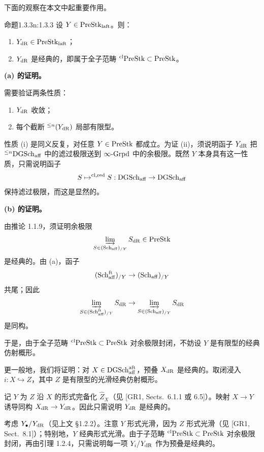 下面的观察在本文中起重要作用。

\begin{othm}{命题}{1.3.3}{n:1.3.3}
设 $Y\in\mathrm{PreStk}_{\mathrm{laft}}$。则：
\begin{enumerate}[label=(\alph*),leftmargin=2.2em,nosep]
\item $Y_{\mathrm{dR}}\in\mathrm{PreStk}_{\mathrm{laft}}$；
\item $Y_{\mathrm{dR}}$ 是经典的，即属于全子范畴 ${}^{\mathrm{cl}}\mathrm{PreStk}\subset\mathrm{PreStk}$。
\end{enumerate}
\end{othm}

\textbf{(a) 的证明。}

需要验证两条性质：
\begin{enumerate}[label=(\roman*),leftmargin=2.2em,nosep]
\item $Y_{\mathrm{dR}}$ 收敛；
\item 每个截断 ${}^{\le n}(Y_{\mathrm{dR}})$ 局部有限型。
\end{enumerate}
性质 (i) 是同义反复，对任意 $Y\in\mathrm{PreStk}$ 都成立。为证 (ii)，须说明函子 $Y_{\mathrm{dR}}$ 把 ${}^{\le n}\mathrm{DGSch}_{\mathrm{aff}}$ 中的滤过极限送到 $\infty\text{-}\mathrm{Grpd}$ 中的余极限。既然 $Y$ 本身具有这一性质，只需说明函子
\[
S\mapsto^{\mathrm{cl,red}} S:\mathrm{DGSch}_{\mathrm{aff}}\to\mathrm{DGSch}_{\mathrm{aff}}
\]
保持滤过极限，而这是显然的。

\textbf{(b) 的证明。}

由推论 1.1.9，须证明余极限
\[
\varinjlim_{S\in(\mathrm{Sch}_{\mathrm{aff}})_{/Y}}S_{\mathrm{dR}}\in\mathrm{PreStk}
\]
是经典的。由 (a)，函子
\[
(\mathrm{Sch}_{\mathrm{aff}}^{\mathrm{ft}})_{/Y}\to(\mathrm{Sch}_{\mathrm{aff}})_{/Y}
\]
共尾；因此
\[
\varinjlim_{S\in(\mathrm{Sch}_{\mathrm{aff}}^{\mathrm{ft}})_{/Y}}S_{\mathrm{dR}}\to\varinjlim_{S\in(\mathrm{Sch}_{\mathrm{aff}})_{/Y}}S_{\mathrm{dR}}
\]
是同构。

于是，由于全子范畴 ${}^{\mathrm{cl}}\mathrm{PreStk}\subset\mathrm{PreStk}$ 对余极限封闭，不妨设 $Y$ 是有限型的经典仿射概形。

更一般地，我们将证明：对 $X\in\mathrm{DGSch}_{\mathrm{aff}}^{\mathrm{aft}}$，预叠 $X_{\mathrm{dR}}$ 是经典的。取闭浸入 $i:X\hookrightarrow Z$，其中 $Z$ 是有限型的光滑经典仿射概形。

记 $Y$ 为 $Z$ 沿 $X$ 的形式完备化 $\widehat{Z}_X$（见 [GR1, Sects.~6.1.1 或 6.5]）。映射 $X\to Y$ 诱导同构 $X_{\mathrm{dR}}\to Y_{\mathrm{dR}}$。因此只需说明 $Y_{\mathrm{dR}}$ 是经典的。

考虑 $Y_\bullet/Y_{\mathrm{dR}}$（见上文 §1.2.2）。注意 $Y$ 形式光滑，因为 $Z$ 形式光滑（见 [GR1, Sect.~8.1]）；特别地，$Y$ 经典形式光滑。由于子范畴 ${}^{\mathrm{cl}}\mathrm{PreStk}\subset\mathrm{PreStk}$ 对余极限封闭，再由引理 1.2.4，只需说明每一项 $Y_i/Y_{\mathrm{dR}}$ 作为预叠是经典的。

